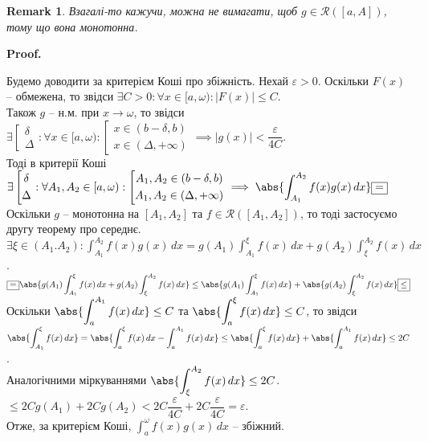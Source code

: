 \documentclass[a4paper, 10pt]{article}
\makeatletter
\def\huge{\displaystyle}
\theoremstyle{theoremdd}
\theoremstyle{theoremdd}
\theoremstyle{theoremdd}
\theoremstyle{theoremdd}
\theoremstyle{theoremdd}
\theoremstyle{theoremdd}
\theoremstyle{theoremdd}
\newtheorem{remark}[theorem]{Remark}
\theoremstyle{theoremdd}
\theoremstyle{theoremdd}
\renewenvironment{proof}[1][Proof.\\]{\par
\pushQED{\hfill \qed}%
\normalfont \topsep6\p@\@plus6\p@\relax
\trivlist
\item\relax
{\bfseries
#1\@addpunct{.}}\hspace\labelsep\ignorespaces
}{%
\popQED\endtrivlist\@endpefalse
}
\makeatother
\begin{document}
\begin{remark}
Взагалі-то кажучи, можна не вимагати, щоб $g \in \mathcal{R}([a,A])$, тому що вона монотонна.
\end{remark}

\begin{proof}
Будемо доводити за критерієм Коші про збіжність. Нехай $\varepsilon > 0$. Оскільки $F(x)$ -- обмежена, то звідси $\exists C > 0: \forall x \in [a,\omega): |F(x)| \leq C$.\\
Також $g$ -- н.м. при $x \to \omega$, то звідси $\exists \left[ \begin{gathered} \delta \\ \Delta \end{gathered} \right.: \forall x \in [a,\omega): \left[ \begin{gathered} x \in (b-\delta,b) \\ x \in (\Delta,+\infty) \end{gathered} \right. \implies |g(x)| < \dfrac{\varepsilon}{4C}$.\\
Тоді в критерії Коші $\exists \left[ \begin{gathered} \delta \\ \Delta \end{gathered} \right.: \forall A_1,A_2 \in [a,\omega): \left[ \begin{gathered} A_1,A_2 \in (b-\delta,b) \\ A_1,A_2 \in (\Delta,+\infty) \end{gathered} \right. \huge\implies \abs{\int_{A_1}^{A_2} f(x)g(x)\,dx} \boxed{=}$\\
Оскільки $g$ -- монотонна на $[A_1,A_2]$ та $f \in \mathcal{R}([A_1,A_2])$, то тоді застосуємо другу теорему про середнє.\\
$\exists \xi \in (A_1.A_2): \huge\int_{A_1}^{A_2} f(x)g(x)\,dx = g(A_1) \int_{A_1}^{\xi} f(x)\,dx + g(A_2) \int_{\xi}^{A_2} f(x)\,dx$.\\
$\huge\boxed{=} \abs{g(A_1) \int_{A_1}^{\xi} f(x)\,dx + g(A_2) \int_{\xi}^{A_2} f(x)\,dx} \leq \abs{g(A_1) \int_{A_1}^{\xi} f(x)\,dx} + \abs{g(A_2) \int_{\xi}^{A_2} f(x)\,dx} \boxed{\leq}$\\
Оскільки $\abs{\huge\int_a^{A_1} f(x)\,dx} \leq C$ та $\abs{\huge\int_a^{\xi} f(x)\,dx} \leq C$, то звідси \\ $\huge\abs{\int_{A_1}^{\xi} f(x)\,dx} = \abs{\int_{a}^{\xi} f(x)\,dx - \int_{a}^{A_1}f(x)\,dx} \leq \abs{\int_a^\xi f(x)\,dx} + \abs{\int_a^{A_1} f(x)\,dx} \leq 2C$.\\
Аналогічними міркуваннями $\huge\abs{\int_{\xi}^{A_2} f(x)\,dx} \leq 2C$.\\
$\boxed{\leq} 2C g(A_1) + 2C g(A_2) < 2C \dfrac{\varepsilon}{4C} + 2C \dfrac{\varepsilon}{4C} = \varepsilon$.\\
Отже, за критерієм Коші, $\huge\int_a^\omega f(x)g(x)\,dx$ -- збіжний.
\end{proof}
\end{document}
